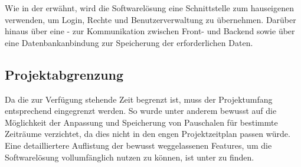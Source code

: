Wie in der  erwähnt, wird die Softwarelösung eine Schnittstelle zum hauseigenen  verwenden, um Login, Rechte und Benutzerverwaltung zu übernehmen. Darüber hinaus über eine - zur Kommunikation zwischen Front- und Backend sowie über eine Datenbankanbindung zur Speicherung der erforderlichen Daten.

\subsection{Projektabgrenzung}
\label{sec:Einführung-Definitionsphase:Projektabgrenzung}

Da die zur Verfügung stehende Zeit begrenzt ist, muss der Projektumfang entsprechend eingegrenzt werden. So wurde unter anderem bewusst auf die Möglichkeit der Anpassung und Speicherung von Pauschalen für bestimmte Zeiträume verzichtet, da dies nicht in den engen Projektzeitplan passen würde. Eine detailliertere Auflistung der bewusst weggelassenen Features, um die Softwarelösung vollumfänglich nutzen zu können, ist unter  zu finden.